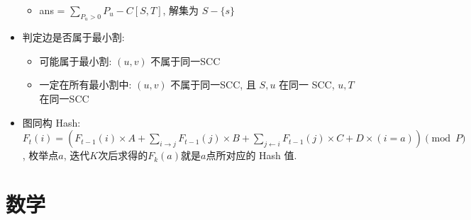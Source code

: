 \documentclass[landscape, twocolumn, 8pt, a4paper, twoside]{extarticle}
\begin{document}
\begin{spacing}{0.1}
\begin{itemize}
\begin{itemize}
  \item ans = $\sum\limits_{P_u > 0}^{} P_u - C[S, T]$, 解集为 $S - \{s\}$
  \end{itemize}
\item 判定边是否属于最小割:
  \begin{itemize}
  \item 可能属于最小割: $(u, v)$ 不属于同一SCC
  \item 一定在所有最小割中: $(u, v)$ 不属于同一SCC, 且 $S, u$ 在同一 SCC, $u, T$ 在同一SCC
  \end{itemize}
\item 图同构 Hash: $F_t(i) = (F_{t - 1}(i) \times A
  + \sum_{i \rightarrow j} F_{t - 1}(j) \times B
  + \sum_{j \leftarrow i} F_{t - 1}(j) \times C
  + D \times (i = a)
  ) \pmod{P}$, 枚举点$a$, 迭代$K$次后求得的$F_k(a)$就是$a$点所对应的 Hash 值. 
\end{itemize}

\section{数学}

\end{spacing}
\end{document}
